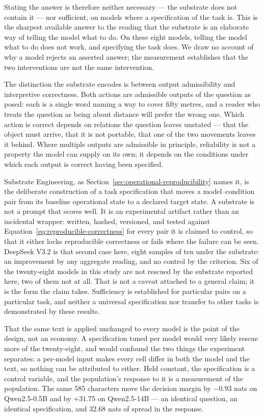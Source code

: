 Stating the answer is therefore neither necessary --- the substrate does not contain
it --- nor sufficient, on models where a specification of the task is. This is the
sharpest available answer to the reading that the substrate is an elaborate way of
telling the model what to do. On these eight models, telling the model what to do
does not work, and specifying the task does. We draw no account of why a model
rejects an asserted answer; the measurement establishes that the two interventions
are not the same intervention.

The distinction the substrate encodes is between output admissibility and
interpretive correctness. Both actions are admissible outputs of the question as
posed: each is a single word naming a way to cover fifty metres, and a reader who
treats the question as being about distance will prefer the wrong one. Which action
is correct depends on relations the question leaves unstated --- that the object must
arrive, that it is not portable, that one of the two movements leaves it behind.
Where multiple outputs are admissible in principle, reliability is not a property the
model can supply on its own; it depends on the conditions under which each output is
correct having been specified.

Substrate Engineering, as Section~\ref{sec:operational-reproducibility} names it, is
the deliberate construction of a task specification that moves a model--condition
pair from its baseline operational state to a declared target state. A substrate is
not a prompt that scores well. It is an experimental artifact rather than an
incidental wrapper: written, hashed, versioned, and tested against
Equation~\eqref{eq:reproducible-correctness} for every pair it is claimed to control,
so that it either locks reproducible correctness or fails where the failure can be
seen. DeepSeek V3.2 is that second case here, eight samples of ten under the
substrate: an improvement by any aggregate reading, and no control by the criterion.
Six of the twenty-eight models in this study
are not rescued by the substrate reported here, two of them not at all. That is not
a caveat attached to a general claim; it is the form the claim takes. Sufficiency is
established for particular pairs on a particular task, and neither a universal
specification nor transfer to other tasks is demonstrated by these results.

That the same text is applied unchanged to every model is the point of the design,
not an economy. A specification tuned per model would very likely rescue more of the
twenty-eight, and would confound the two things the experiment separates: a
per-model input makes every cell differ in both the model and the text, so nothing
can be attributed to either. Held constant, the specification is a control variable,
and the population's response to it is a measurement of the population. The same
$585$ characters move the decision margin by $-0.93$ nats on Qwen2.5-0.5B and by
$+31.75$ on Qwen2.5-14B --- an identical question, an identical specification, and
$32.68$ nats of spread in the response.

